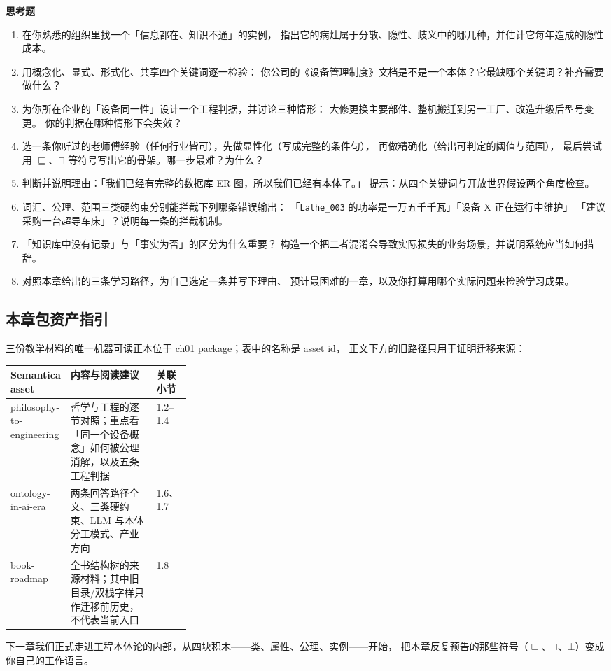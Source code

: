 \begin{noteblock}
\textbf{思考题}
\begin{enumerate}
\item 在你熟悉的组织里找一个「信息都在、知识不通」的实例，
      指出它的病灶属于分散、隐性、歧义中的哪几种，并估计它每年造成的隐性成本。
\item 用概念化、显式、形式化、共享四个关键词逐一检验：
      你公司的《设备管理制度》文档是不是一个本体？它最缺哪个关键词？补齐需要做什么？
\item 为你所在企业的「设备同一性」设计一个工程判据，并讨论三种情形：
      大修更换主要部件、整机搬迁到另一工厂、改造升级后型号变更。
      你的判据在哪种情形下会失效？
\item 选一条你听过的老师傅经验（任何行业皆可），先做显性化（写成完整的条件句），
      再做精确化（给出可判定的阈值与范围），
      最后尝试用 \(\sqsubseteq\)、\(\sqcap\) 等符号写出它的骨架。哪一步最难？为什么？
\item 判断并说明理由：「我们已经有完整的数据库 ER 图，所以我们已经有本体了。」
      提示：从四个关键词与开放世界假设两个角度检查。
\item 词汇、公理、范围三类硬约束分别能拦截下列哪条错误输出：
      「\texttt{Lathe\_003} 的功率是一万五千千瓦」「设备 X 正在运行中维护」
      「建议采购一台超导车床」？说明每一条的拦截机制。
\item 「知识库中没有记录」与「事实为否」的区分为什么重要？
      构造一个把二者混淆会导致实际损失的业务场景，并说明系统应当如何措辞。
\item 对照本章给出的三条学习路径，为自己选定一条并写下理由、
      预计最困难的一章，以及你打算用哪个实际问题来检验学习成果。
\end{enumerate}
\end{noteblock}

\subsection{本章包资产指引}

三份教学材料的唯一机器可读正本位于 ch01 package；表中的名称是 asset id，
正文下方的旧路径只用于证明迁移来源：

\begin{center}
\begin{tabularx}{\linewidth}{@{}>{\ttfamily\footnotesize}p{0.30\linewidth}Xl@{}}
\toprule
\normalfont\textbf{Semantica asset} & \textbf{内容与阅读建议} & \textbf{关联小节} \\
\midrule
philosophy-to-engineering & 哲学与工程的逐节对照；重点看「同一个设备概念」如何被公理消解，以及五条工程判据 & 1.2--1.4 \\
ontology-in-ai-era & 两条回答路径全文、三类硬约束、LLM 与本体分工模式、产业方向 & 1.6、1.7 \\
book-roadmap & 全书结构树的来源材料；其中旧目录/双栈字样只作迁移前历史，不代表当前入口 & 1.8 \\
\bottomrule
\end{tabularx}
\end{center}

下一章我们正式走进工程本体论的内部，从四块积木——类、属性、公理、实例——开始，
把本章反复预告的那些符号（\(\sqsubseteq\)、\(\sqcap\)、\(\bot\)）变成你自己的工作语言。
